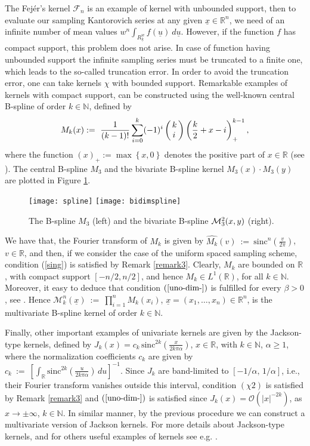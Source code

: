 \documentclass[11pt,a4paper]{article}
\newcommand{\N}{\mathbb{N}}
\newcommand{\R}{\mathbb{R}}
\newcommand{\kk}{\underline{k}}
\newcommand{\uu}{\underline{u}}
\newcommand{\xx}{\underline{x}}
\begin{document}
  The Fej\'{e}r's kernel $\mathcal{F}_n$ is an example of kernel with unbounded support, then to evaluate our sampling Kantorovich series at any given $\xx \in \R^n$, we need of an infinite number of mean values $w^n \int_{R^w_{\kk}}f(\uu)\ d\uu$. However, if the function $f$ has compact support, this problem does not arise. In case of function having unbounded support the infinite sampling series must be truncated to a finite one, which leads to the so-called truncation error. In order to avoid the truncation error, one can take kernels $\chi$ with bounded support. Remarkable examples of kernels with compact support, can be constructed using the well-known central B-spline of order $k \in \N$, defined by
$$
M_k(x) :=\ \frac{1}{(k-1)!}\sum^k_{i=0}(-1)^i \left(\begin{array}{l} \!\! 
k\\
\hskip-0.1cm i
\end{array} \!\! \right)
\left(\frac{k}{2}+x-i\right)^{k-1}_+,
$$
where the function $(x)_+ := \max\left\{x,0\right\}$ denotes the positive part of $x \in \R$ (see \cite{BABUSTVI,VIZA1,COVI}). The central B-spline $M_3$ and the bivariate B-spline kernel $M_3(x)\cdot M_3(y)$ are plotted in Figure \ref{fig2}.
\begin{figure}
\centering
\texttt{[image: spline]}
\hskip0.7cm
\texttt{[image: bidimspline]}
\caption{\small{The B-spline $M_3$ (left) and the bivariate B-spline ${\cal M}^2_3(x,y)$ (right).}} \label{fig2}
\end{figure}
We have that, the Fourier transform of $M_k$ is given by
$\widehat{M_k}(v)\ :=\ \mbox{sinc}^n\left( \frac{v}{2 \pi} \right)$, $v \in \R$, and then, if we consider the case of the uniform spaced sampling scheme, condition (\ref{sing}) is satisfied by Remark \ref{remark3}. Clearly, $M_k$ are bounded on $\R$, with compact support $[-n/2,n/2]$, and hence $M_k \in L^1(\R)$, for all $k \in \N$. Moreover, it easy to deduce that condition $(\ref{uno-dim-})$ is fulfilled for every $\beta>0$, see \cite{BABUSTVI}.
Hence $\mathcal{M}^n_k(\xx)\ :=\ \prod^n_{i=1}M_k(x_i)$, $\underline{x}=(x_1,\dots,x_n) \in \R^n$,
is the multivariate B-spline kernel of order $k \in \N$.

  Finally, other important examples of univariate kernels are given by the Jackson-type kernels, defined by
$J_k(x)=c_k\, \mbox{sinc}^{2k}\left(\frac{x}{2k\pi\alpha}\right)$, $x \in  \R$,
with $k \in \N$, $\alpha \geq 1$, where the normalization coefficients $c_k$ are given by
$c_k\ :=\ \left[ \int_{\R} \mbox{sinc}^{2k}\left(\frac{u}{2 k \pi \alpha} \right) \, du \right]^{-1}$.
Since $J_k$ are band-limited to $[-1/\alpha,\, 1/\alpha]$, i.e., their Fourier transform vanishes outside this interval, condition $(\chi 2)$ is satisfied by Remark \ref{remark3} and $(\ref{uno-dim-})$ is satisfied since $J_k(x)=\mathcal{O}(|x|^{-2k})$, as $x \to \pm \infty$, $k \in \N$. In similar manner, by the previous procedure we can construct a multivariate version of Jackson kernels. For more details about Jackson-type kernels, and for others useful examples of kernels see e.g. \cite{BUNE,BAMUVI,BABUSTVI0,BABUSTVI}.
%
\end{document}

